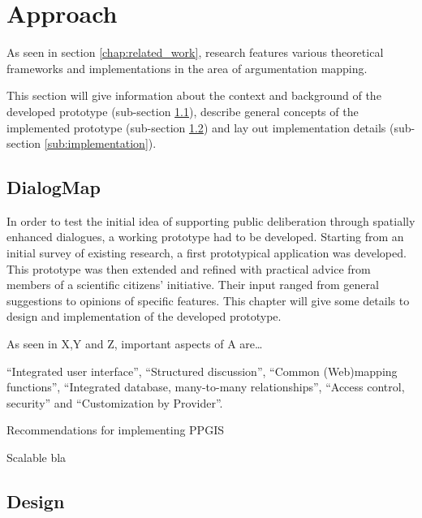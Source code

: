 \section{Approach}

As seen in section \ref{chap:related_work}, research features various theoretical frameworks and implementations in the area of argumentation mapping. 

This section will give information about the context and background of the  developed prototype (sub-section \ref{sub:dialogmap}), describe general concepts of the implemented prototype (sub-section \ref{sub:design}) and lay out implementation details (sub-section \ref{sub:implementation}).

\subsection{DialogMap}
\label{sub:dialogmap}

In order to test the initial idea of supporting public deliberation through spatially enhanced dialogues, a working prototype had to be developed. Starting from an initial survey of existing research, a first prototypical application was developed. This prototype was then extended and refined with practical advice from members of a scientific citizens' initiative. Their input ranged from general suggestions to opinions of specific features. This chapter will give some details to design and implementation of the developed prototype.

As seen in X,Y and Z, important aspects of A are\dots

``Integrated user interface'', ``Structured discussion'', ``Common (Web)mapping functions'', ``Integrated database, many-to-many relationships'', ``Access control, security'' and ``Customization by Provider''. \cite{Kessler2005_ArgumentationMapPrototype}

Recommendations for implementing PPGIS \cite{Carver2001_PPGIS_Cyberdemocracy} \cite{Voss2004_Evolution_PGIS}

Scalable bla \cite{Sani2011_Scalable_Argumap}

\subsection{Design} %
\label{sub:design}

